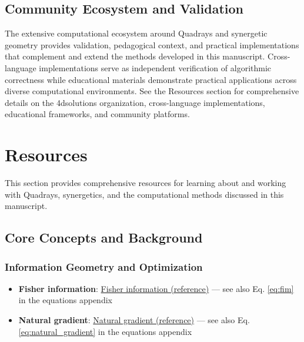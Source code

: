 \documentclass[
  10pt,
]{article}
\providecommand{\tightlist}{%
  \setlength{\itemsep}{0pt}\setlength{\parskip}{0pt}}
\begin{document}
\hypertarget{community-ecosystem-and-validation}{%
\subsection{Community Ecosystem and
Validation}\label{community-ecosystem-and-validation}}

The extensive computational ecosystem around Quadrays and synergetic
geometry provides validation, pedagogical context, and practical
implementations that complement and extend the methods developed in this
manuscript. Cross-language implementations serve as independent
verification of algorithmic correctness while educational materials
demonstrate practical applications across diverse computational
environments. See the Resources section for comprehensive details on the
4dsolutions organization, cross-language implementations, educational
frameworks, and community platforms.

\newpage

\hypertarget{resources}{%
\section{Resources}\label{resources}}

This section provides comprehensive resources for learning about and
working with Quadrays, synergetics, and the computational methods
discussed in this manuscript.

\hypertarget{core-concepts-and-background}{%
\subsection{Core Concepts and
Background}\label{core-concepts-and-background}}

\hypertarget{information-geometry-and-optimization}{%
\subsubsection{Information Geometry and
Optimization}\label{information-geometry-and-optimization}}

\begin{itemize}
\tightlist
\item
  \textbf{Fisher information}:
  \href{https://en.wikipedia.org/wiki/Fisher_information}{Fisher
  information (reference)} --- see also Eq. \eqref{eq:fim} in the
  equations appendix
\item
  \textbf{Natural gradient}:
  \href{https://en.wikipedia.org/wiki/Natural_gradient}{Natural gradient
  (reference)} --- see also Eq. \eqref{eq:natural_gradient} in the
  equations appendix
\end{itemize}
\end{document}
